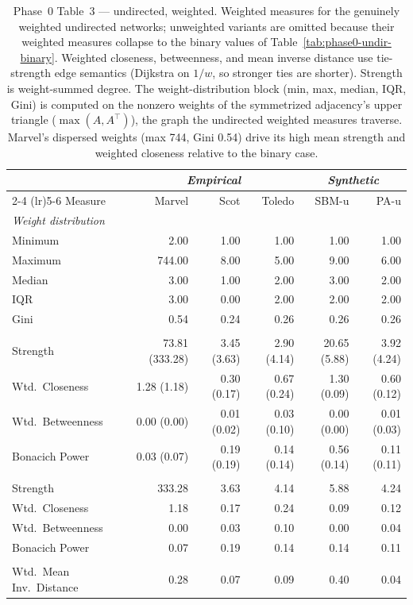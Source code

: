 \documentclass[11pt]{article}
\begin{document}
\begin{table}[!htbp]
\centering
\footnotesize
\setlength{\tabcolsep}{4pt}
\begin{tabular}{l r r r | r r}
\toprule
& \multicolumn{3}{c|}{\textit{Empirical}} & \multicolumn{2}{c}{\textit{Synthetic}} \\
\cmidrule(lr){2-4} \cmidrule(lr){5-6}
Measure & Marvel & Scot & Toledo & SBM-u & PA-u \\
\midrule
\multicolumn{6}{l}{\textit{Weight distribution}} \\
Minimum & 2.00   & 1.00 & 1.00 & 1.00 & 1.00 \\
Maximum & 744.00 & 8.00 & 5.00 & 9.00 & 6.00 \\
Median  & 3.00   & 1.00 & 2.00 & 3.00 & 2.00 \\
IQR     & 3.00   & 0.00 & 2.00 & 2.00 & 2.00 \\
Gini    & 0.54   & 0.24 & 0.26 & 0.26 & 0.26 \\
\addlinespace
\multicolumn{6}{l}{\textit{Centrality}, mean (SD)} \\
Strength            & 73.81 (333.28) & 3.45 (3.63) & 2.90 (4.14) & 20.65 (5.88) & 3.92 (4.24) \\
Wtd.\ Closeness     & 1.28 (1.18)    & 0.30 (0.17) & 0.67 (0.24) & 1.30 (0.09)  & 0.60 (0.12) \\
Wtd.\ Betweenness   & 0.00 (0.00)    & 0.01 (0.02) & 0.03 (0.10) & 0.00 (0.00)  & 0.01 (0.03) \\
Bonacich Power      & 0.03 (0.07)    & 0.19 (0.19) & 0.14 (0.14) & 0.56 (0.14)  & 0.11 (0.11) \\
\addlinespace
\multicolumn{6}{l}{\textit{Centralization} (SD of node scores)} \\
Strength          & 333.28 & 3.63 & 4.14 & 5.88 & 4.24 \\
Wtd.\ Closeness   & 1.18   & 0.17 & 0.24 & 0.09 & 0.12 \\
Wtd.\ Betweenness & 0.00   & 0.03 & 0.10 & 0.00 & 0.04 \\
Bonacich Power    & 0.07   & 0.19 & 0.14 & 0.14 & 0.11 \\
\addlinespace
\multicolumn{6}{l}{\textit{Topology}} \\
Wtd.\ Mean Inv.\ Distance & 0.28 & 0.07 & 0.09 & 0.40 & 0.04 \\
\bottomrule
\end{tabular}
\caption{Phase~0 Table~3 --- undirected, weighted. Weighted measures for the genuinely weighted undirected networks; unweighted variants are omitted because their weighted measures collapse to the binary values of Table~\ref{tab:phase0-undir-binary}. Weighted closeness, betweenness, and mean inverse distance use tie-strength edge semantics (Dijkstra on $1/w$, so stronger ties are shorter). Strength is weight-summed degree. The weight-distribution block (min, max, median, IQR, Gini) is computed on the nonzero weights of the symmetrized adjacency's upper triangle ($\max(A, A^\top)$), the graph the undirected weighted measures traverse. Marvel's dispersed weights (max 744, Gini 0.54) drive its high mean strength and weighted closeness relative to the binary case.}
\label{tab:phase0-undir-weighted}
\end{table}
\end{document}
